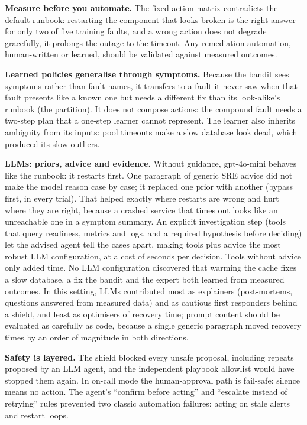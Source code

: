 \textbf{Measure before you automate.} The fixed-action matrix contradicts the default runbook: restarting
the component that looks broken is the right answer for only two of five training faults, and a
wrong action does not degrade gracefully, it prolongs the outage to the timeout. Any remediation
automation, human-written or learned, should be validated against measured outcomes.

\textbf{Learned policies generalise through symptoms.} Because the bandit sees symptoms rather than
fault names, it transfers to a fault it never saw when that fault presents like a known one but
needs a different fix than its look-alike's runbook (the partition). It does not compose actions:
the compound fault needs a two-step plan that a one-step learner cannot represent. The learner also
inherits ambiguity from its inputs: pool timeouts make a slow database look dead, which produced its
slow outliers.

\textbf{LLMs: priors, advice and evidence.} Without guidance, gpt-4o-mini behaves like the runbook: it
restarts first. One paragraph of generic SRE advice did not make the model reason case by case; it
replaced one prior with another (bypass first, in every trial). That helped exactly where restarts are
wrong and hurt where they are right, because a crashed service that times out looks like an unreachable
one in a symptom summary. An explicit investigation step (tools that query readiness, metrics and logs,
and a required hypothesis before deciding) let the advised agent tell the cases apart, making tools plus
advice the most robust LLM configuration, at a cost of seconds per decision. Tools without advice only
added time. No LLM configuration discovered that warming the cache fixes a slow database, a fix the
bandit and the expert both learned from measured outcomes. In this setting, LLMs contributed most as
explainers (post-mortems, questions answered from measured data) and as cautious first responders
behind a shield, and least as optimisers of recovery time; prompt content should be evaluated as
carefully as code, because a single generic paragraph moved recovery times by an order of magnitude in
both directions.

\textbf{Safety is layered.} The shield blocked every unsafe proposal, including repeats proposed by an
LLM agent, and the independent playbook allowlist would have stopped them again. In on-call mode the
human-approval path is fail-safe: silence means no action. The agent's ``confirm before acting'' and
``escalate instead of retrying'' rules prevented two classic automation failures: acting on stale
alerts and restart loops.
